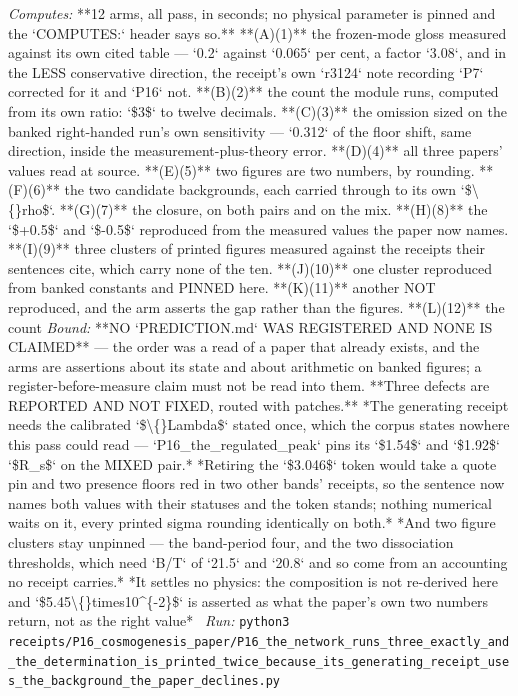 \begin{description}
\emph{Computes:} **12 arms, all pass, in seconds; no physical parameter is pinned and the `COMPUTES:` header says so.** **(A)(1)** the frozen-mode gloss measured against its own cited table --- `0.2` against `0.065` per cent, a factor `3.08`, and in the LESS conservative direction, the receipt's own `r3124` note recording `P7` corrected for it and `P16` not. **(B)(2)** the count the module runs, computed from its own ratio: `\$3\$` to twelve decimals. **(C)(3)** the omission sized on the banked right-handed run's own sensitivity --- `0.312` of the floor shift, same direction, inside the measurement-plus-theory error. **(D)(4)** all three papers' values read at source. **(E)(5)** two figures are two numbers, by rounding. **(F)(6)** the two candidate backgrounds, each carried through to its own `\$\textbackslash\{\}rho\$`. **(G)(7)** the closure, on both pairs and on the mix. **(H)(8)** the `\$+0.5\$` and `\$-0.5\$` reproduced from the measured values the paper now names. **(I)(9)** three clusters of printed figures measured against the receipts their sentences cite, which carry none of the ten. **(J)(10)** one cluster reproduced from banked constants and PINNED here. **(K)(11)** another NOT reproduced, and the arm asserts the gap rather than the figures. **(L)(12)** the count
 \emph{Bound:}  **NO `PREDICTION.md` WAS REGISTERED AND NONE IS CLAIMED** --- the order was a read of a paper that already exists, and the arms are assertions about its state and about arithmetic on banked figures; a register-before-measure claim must not be read into them.  **Three defects are REPORTED AND NOT FIXED, routed with patches.** *The generating receipt needs the calibrated `\$\textbackslash\{\}Lambda\$` stated once, which the corpus states nowhere this pass could read --- `P16\_the\_regulated\_peak` pins its `\$1.54\$` and `\$1.92\$` `\$R\_s\$` on the MIXED pair.* *Retiring the `\$3.046\$` token would take a quote pin and two presence floors red in two other bands' receipts, so the sentence now names both values with their statuses and the token stands; nothing numerical waits on it, every printed sigma rounding identically on both.* *And two figure clusters stay unpinned --- the band-period four, and the two dissociation thresholds, which need `B/T` of `21.5` and `20.8` and so come from an accounting no receipt carries.*  *It settles no physics: the composition is not re-derived here and `\$5.45\textbackslash\{\}times10\textasciicircum{}\{-2\}\$` is asserted as what the paper's own two numbers return, not as the right value*
\ \emph{Run:} \texttt{python3 receipts/P16\_cosmogenesis\_paper/P16\_the\_network\_runs\_three\_exactly\_and\_the\_determination\_is\_printed\_twice\_because\_its\_generating\_receipt\_uses\_the\_background\_the\_paper\_declines.py}

\end{description}
